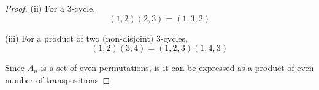 \documentclass[paper=usletter, fontsize=12pt]{article}
\begin{document}
\begin{itemize}
\begin{itemize}
\begin{proof}
                (ii) For a 3-cycle,
                \begin{equation*}
                    (1,2)(2,3) = (1,3,2)
                \end{equation*}

                (iii) For a product of two (non-disjoint) 3-cycles,
                \begin{equation*}
                    (1,2)(3,4) = (1,2,3)(1,4,3)
                \end{equation*}

                Since $A_n$ is a set of even permutations, is it can be
                expressed as a product of even number of transpositions
                \qedhere

            \end{proof}

        \end{itemize}

    \end{itemize}
\end{document}
